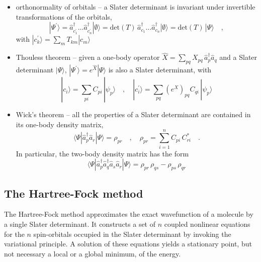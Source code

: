 \documentclass{article}
\newcommand{\CRE}[1]{\hat{a}^\dagger_{#1}}
\newcommand{\DIS}[1]{\hat{a}^{\phantom{\dagger}}_{#1}}
\begin{document}
\begin{itemize}
\item orthonormality of orbitals -- a Slater determinant is invariant under invertible transformations of the orbitals,
\begin{equation}
| \Psi^\prime \rangle = \CRE{c^\prime_1} \dots \CRE{c^\prime_n} | \emptyset \rangle = \mbox{det}(T) \, \CRE{c_1} \dots \CRE{c_n} | \emptyset \rangle = \mbox{det}(T) \, | \Psi \rangle
\quad,
\end{equation}
with $| c^\prime_k \rangle = \sum_m T_{km} | c_m \rangle$
\item Thouless theorem -- given a one-body operator $\hat{X} = \sum_{pq} X_{pq} \, \CRE{p} \DIS{q}$ and a Slater determinant $| \Psi \rangle$,
$| \Psi^\prime \rangle = e^{ \hat{X} } | \Psi \rangle$ is also a Slater determinant, with
\begin{equation}
| c_i \rangle = \sum_{pi} C_{pi} \, | \psi_p \rangle
\quad,\quad
| c_i^\prime \rangle = \sum_{pq} \left( e^{X} \right)_{pq} C_{qi} \, | \psi_p \rangle
\end{equation}
\item Wick's theorem -- all the properties of a Slater determinant are contained in its one-body density matrix,
\begin{equation}
\langle \Psi | \CRE{p} \DIS{r} | \Psi \rangle = \rho_{pr}
\quad,\quad
\rho_{pr} = \sum_{i=1}^n C_{pi}  \, C^*_{ri}
\quad.
\end{equation}
In particular, the two-body density matrix has the form
\begin{equation}
\langle \Psi | \CRE{p} \CRE{q} \DIS{s} \DIS{r} | \Psi \rangle = \rho_{pr} \, \rho_{qs} - \rho_{ps} \, \rho_{qr}
\end{equation}
\end{itemize}

\subsection{The Hartree-Fock method}

The Hartree-Fock method approximates the exact wavefunction of a molecule by a single Slater determinant.
It constructs a set of $n$ coupled nonlinear equations for the $n$ spin-orbitals occupied in the Slater determinant by invoking the variational principle.
A solution of these equations yields a stationary point, but not necessary a local or a global minimum, of the energy.
\end{document}
